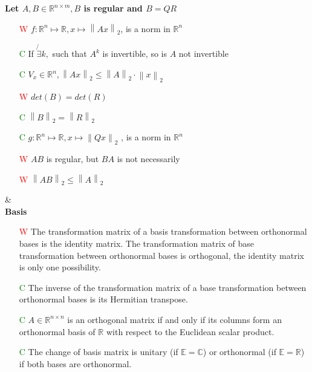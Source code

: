 \documentclass[7pt,landscape, margin = 0.1mm]{article}
\begin{document}
\begin{multicols}{4}
\begin{flushleft}
\hspace{3mm}
\textbf{Let $A,B  \in \mathbb{R}^{n \times m} , B $ is regular and $B =QR $ }
\begin{itemize}

\item[\textcolor{red}{W}] $f: \mathbb{R}^n \mapsto \mathbb{R}, x \mapsto \left\| Ax\right\|_2 $, is a norm in $ \mathbb{R}^n$ 
\item[\textcolor{green}{C}] If $\not{\exists}k, $ such that $A^k$ is invertible, so is $A$ not invertible
\item[\textcolor{green}{C}] $V_x \in \mathbb{R}^n, \left\|Ax \right\|_2 \leq   \left\|A \right\|_2 \cdot  \left\|x \right\|_2 $
\item[\textcolor{red}{W}] $det(B) = det(R)$
\item[\textcolor{green}{C}] $  \left\|B \right\|_2 =  \left\|R \right\|_2$
\item[\textcolor{green}{C}] $ g: \mathbb{R}^n \mapsto  \mathbb{R}, x \mapsto \left\|Qx \right\|_2 $ , is a norm in $ \mathbb{R}^n$ 
\item[\textcolor{red}{W}] $AB$ is regular, but $BA$ is not necessarily 
\item[\textcolor{red}{W}] $\left\|AB \right\|_2 \leq \left\| A \right\|_2 $


\end{itemize}


\hspace{3mm}
\hline & \\[3mm]
\scriptsize
\textbf{Basis}
\tiny \\
\begin{itemize}
\item[\textcolor{red}{W}] The transformation matrix of a basis transformation between orthonormal bases is the identity matrix.
\textcolor{Emerald}{The transformation matrix of base transformation between orthonormal bases is orthogonal,
the identity matrix is only one possibility.}
\item[\textcolor{green}{C}] The inverse of the transformation matrix of a base transformation between orthonormal bases is its
Hermitian transpose.
\item[\textcolor{green}{C}] $A  \in \mathbb{R}^{n \times n} $ is an orthogonal matrix if and only if its columns form an orthonormal basis of $\mathbb{R}$ with
respect to the Euclidean scalar product.
\item[\textcolor{green}{C}] The change of basis matrix is unitary (if $\mathbb{E}= \mathbb{C}$) or orthonormal (if $\mathbb{E }= \mathbb{R}$) if both bases are
orthonormal.


\end{itemize}
\end{flushleft}
\end{multicols}
\end{document}
